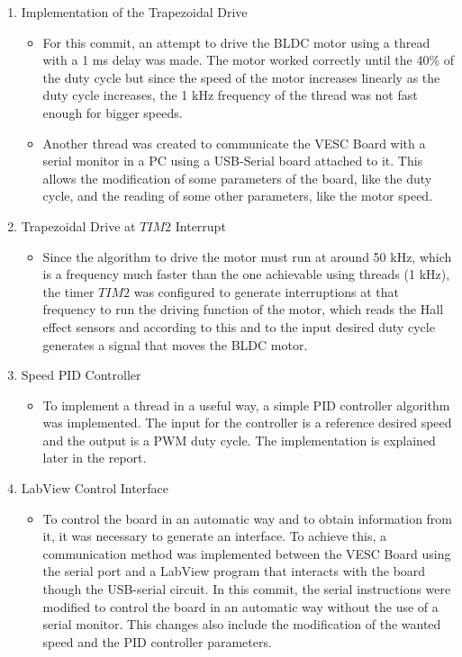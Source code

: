 \begin{enumerate}
\begin {itemize}
		\end {itemize}
	\item Implementation of the Trapezoidal Drive
		\begin {itemize}
			\item For this commit, an attempt to drive the BLDC motor using a thread with a 1 ms delay was made. The motor worked correctly until the 40\% of the duty cycle but since the speed of the motor increases linearly as the duty cycle increases, the 1 kHz frequency of the thread was not fast enough for bigger speeds.
			\item Another thread was created to communicate the VESC Board with a serial monitor in a PC using a USB-Serial board attached to it. This allows the modification of some parameters of the board, like the duty cycle, and the reading of some other parameters, like the motor speed.
		\end {itemize}
	\item Trapezoidal Drive at $TIM2$ Interrupt
		\begin {itemize}
		\item Since the algorithm to drive the motor must run at around 50 kHz, which is a frequency much faster than the one achievable using threads (1 kHz), the timer $TIM2$ was configured to generate interruptions at that frequency to run the driving function of the motor, which reads the Hall effect sensors and according to this and to the input desired duty cycle generates a signal that moves the BLDC motor.
		\end {itemize}
	\item Speed PID Controller
		\begin {itemize}
		\item To implement a thread in a useful way, a simple PID controller algorithm was implemented. The input for the controller is a reference desired speed and the output is a PWM duty cycle. The implementation is explained later in the report.
		\end {itemize}
	\item LabView Control Interface
		\begin {itemize}
		\item To control the board in an automatic way and to obtain information from it, it was necessary to generate an interface. To achieve this, a communication method was implemented between the VESC Board using the serial port and a LabView program that interacts with the board though the USB-serial circuit. In this commit, the serial instructions were modified to control the board in an automatic way without the use of a serial monitor. This changes also include the modification of the wanted speed and the PID controller parameters.
		\end {itemize}
\end{enumerate}

